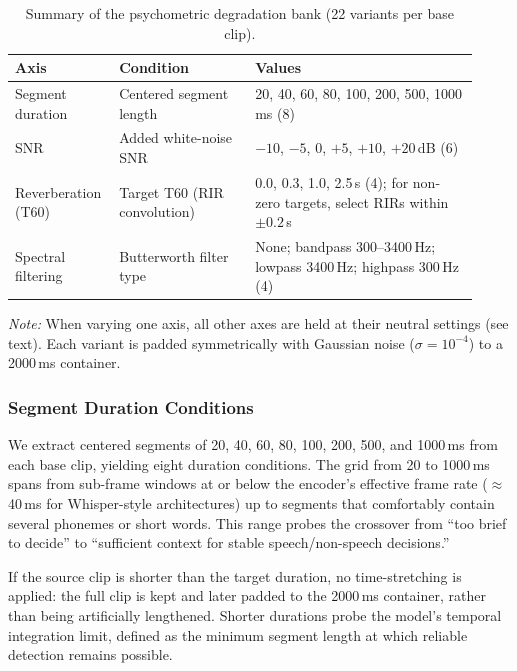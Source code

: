 \documentclass[11pt,a4paper]{article}
\begin{document}
\begin{table}[t]
\centering
\caption{Summary of the psychometric degradation bank (22 variants per base clip).}
\label{tab:degradation_bank}
\footnotesize
\setlength{\tabcolsep}{3pt}
\renewcommand{\arraystretch}{1.15}

\begingroup
\sloppy
\begin{tabular}{p{0.18\linewidth} p{0.28\linewidth} p{0.46\linewidth}}
\hline
\textbf{Axis} & \textbf{Condition} & \textbf{Values} \\
\hline
Segment duration &
Centered segment length &
20, 40, 60, 80, 100, 200, 500, 1000\,ms (8) \\
\hline
SNR &
Added white-noise SNR &
$-10$, $-5$, 0, $+5$, $+10$, $+20$\,dB (6) \\
\hline
Reverberation (T60) &
Target T60 (RIR convolution) &
0.0, 0.3, 1.0, 2.5\,s (4); for non-zero targets, select RIRs within $\pm 0.2$\,s \\
\hline
Spectral filtering &
Butterworth filter type &
None; bandpass 300--3400\,Hz; lowpass 3400\,Hz; highpass 300\,Hz (4) \\
\hline
\end{tabular}

\vspace{0.5ex}
\parbox{\linewidth}{\footnotesize\textit{Note:} When varying one axis, all other axes are held at their neutral settings (see text). Each variant is padded symmetrically with Gaussian noise ($\sigma=10^{-4}$) to a 2000\,ms container.}
\endgroup
\end{table}

\subsubsection{Segment Duration Conditions}
\label{subsubsec:duration}

We extract centered segments of 20, 40, 60, 80, 100, 200, 500, and 1000\,ms from each base clip, yielding eight duration conditions. The grid from 20 to 1000\,ms spans from sub-frame windows at or below the encoder's effective frame rate ($\approx$40\,ms for Whisper-style architectures) up to segments that comfortably contain several phonemes or short words. This range probes the crossover from ``too brief to decide'' to ``sufficient context for stable speech/non-speech decisions.''

If the source clip is shorter than the target duration, no time-stretching is applied: the full clip is kept and later padded to the 2000\,ms container, rather than being artificially lengthened. Shorter durations probe the model's temporal integration limit, defined as the minimum segment length at which reliable detection remains possible.
\end{document}

